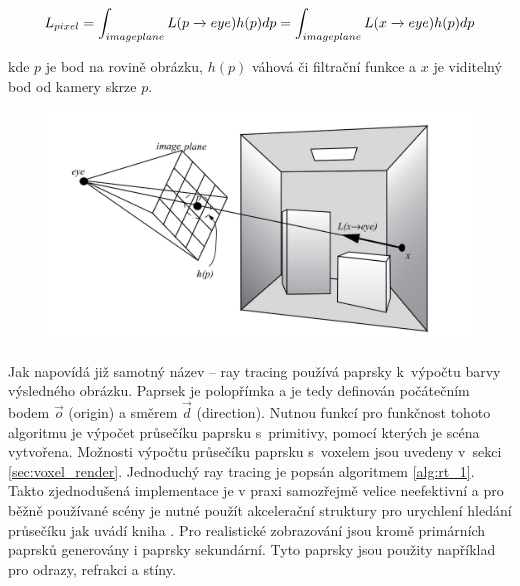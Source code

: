 \begin{equation} \label{eq:rt_1}
	L_{pixel} = \int_{imageplane}L(p \xrightarrow{} eye)h(p)dp \\= \int_{imageplane}L(x \xrightarrow{} eye)h(p)dp
\end{equation}

kde $p$ je bod na rovině obrázku, $h(p)$ váhová či filtrační funkce a $x$ je viditelný bod od kamery skrze $p$.

\begin{figure}[H]
	\centering
	\captionsetup{justification=centering}
	\includegraphics[scale=1]{obrazky-figures/ray_tracing_plane.png}
	\label{fig:scene_ray}
\end{figure}


Jak napovídá již samotný název -- ray tracing používá paprsky k~výpočtu barvy výsledného obrázku. Paprsek je polopřímka a je tedy definován počátečním bodem $\Vec{o}$ (origin) a směrem $\Vec{d}$ (direction). Nutnou funkcí pro funkčnost tohoto algoritmu je výpočet průsečíku paprsku s~primitivy, pomocí kterých je scéna vytvořena. Možnosti výpočtu průsečíku paprsku s~voxelem jsou uvedeny v~sekci \ref{sec:voxel_render}. Jednoduchý ray tracing je popsán algoritmem \ref{alg:rt_1}. Takto zjednodušená implementace je v praxi samozřejmě velice neefektivní a pro běžně používané scény je nutné použít akcelerační struktury pro urychlení hledání průsečíku jak uvádí kniha \cite{accelerated_rt}. Pro realistické zobrazování jsou kromě primárních paprsků generovány i paprsky sekundární. Tyto paprsky jsou použity například pro odrazy, refrakci a stíny.

